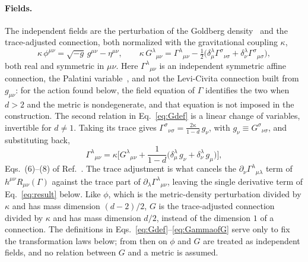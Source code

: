 \documentclass[prd,aps,preprint,nofootinbib,amsmath,amssymb,eqsecnum]{revtex4-2}
\begin{document}
\paragraph{Fields.} The independent fields are the perturbation of the Goldberg
density~\cite{Goldberg1958} and
the trace-adjusted connection, both normalized with the gravitational coupling $\kappa$,
\begin{equation}
\kappa\,\phi^{\mu\nu}=\sqrt{-g}\,g^{\mu\nu}-\eta^{\mu\nu},\qquad
\kappa\,G^{\lambda}{}_{\mu\nu}=\Gamma^{\lambda}{}_{\mu\nu}
-\tfrac12\big(\delta^{\lambda}_{\mu}\Gamma^{\sigma}{}_{\nu\sigma}
+\delta^{\lambda}_{\nu}\Gamma^{\sigma}{}_{\mu\sigma}\big),
\label{eq:Gdef}
\end{equation}
both real and symmetric in $\mu\nu$. Here $\Gamma^{\lambda}{}_{\mu\nu}$ is an independent
symmetric affine connection, the Palatini variable~\cite{Palatini1919,Ferraris1982}, and not
the Levi-Civita connection built
from $g_{\mu\nu}$: for the action found below, the field equation of $\Gamma$ identifies the
two when $d>2$ and the metric is nondegenerate, and that equation is not imposed in the
construction. The second relation in Eq.~\eqref{eq:Gdef} is a linear change of variables,
invertible for $d\neq1$. Taking its trace
gives $\Gamma^{\sigma}{}_{\nu\sigma}=\frac{2\kappa}{1-d}\,g_\nu$, with
$g_\nu\equiv G^{\sigma}{}_{\nu\sigma}$, and substituting back,
\begin{equation}
\Gamma^{\lambda}{}_{\mu\nu}=\kappa\Big[G^{\lambda}{}_{\mu\nu}
+\frac{1}{1-d}\big(\delta^{\lambda}_{\mu}\,g_\nu+\delta^{\lambda}_{\nu}\,g_\mu\big)\Big],
\label{eq:GammaofG}
\end{equation}
Eqs.~(6)--(8) of Ref.~\cite{BrandtMcKeon2015}. The trace adjustment is what cancels the
$\partial_\nu\Gamma^{\lambda}{}_{\mu\lambda}$ term of $h^{\mu\nu}R_{\mu\nu}(\Gamma)$ against
the trace part of $\partial_\lambda\Gamma^{\lambda}{}_{\mu\nu}$, leaving the single derivative
term of Eq.~\eqref{eq:result} below. Like $\phi$, which is the metric-density perturbation divided by
$\kappa$ and has mass dimension $(d-2)/2$, $G$ is the trace-adjusted connection divided by
$\kappa$ and has mass dimension $d/2$, instead of the dimension $1$ of a connection. The definitions in
Eqs.~\eqref{eq:Gdef}--\eqref{eq:GammaofG} serve only to fix the transformation laws below;
from then on $\phi$ and $G$ are treated as independent fields, and no relation between $G$ and
a metric is assumed.
\end{document}
